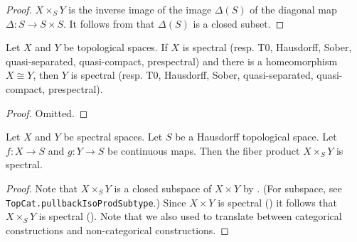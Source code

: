 \begin{proof}
  \leanok
  \(X \times_S Y\) is the inverse image of the image \(\Delta(S)\) of the diagonal map 
  \(\Delta : S \to S \times S\). It follows from  that 
  \(\Delta(S)\) is a closed subset.
\end{proof}

\begin{lemma}
  \label{thm:homeo-preserves-spectral}
  \leanok
  Let \(X\) and \(Y\) be topological spaces. If \(X\) is spectral (resp. T0, Hausdorff, Sober, quasi-separated, quasi-compact, prespectral) and there is a homeomorphism \(X \cong Y\), then \(Y\) is spectral (resp. T0, Hausdorff, Sober, quasi-separated, quasi-compact, prespectral).
\end{lemma}

\begin{proof}
  \leanok
  Omitted.
\end{proof}

\begin{lemma}
  \label{thm:pullback-spectral} 
  \leanok
  Let \(X\) and \(Y\) be spectral spaces. Let \(S\) be a Hausdorff topological space. Let \(f : X \to S\) and \(g : Y \to S\) be continuous maps. Then the fiber product \(X \times_S Y\) is spectral.
\end{lemma}

\begin{proof}
  \leanok
  Note that \(X \times_S Y\) is a closed subspace of $X \times Y$ by 
  . (For subspace, see 
  \verb`TopCat.pullbackIsoProdSubtype`.) Since $X \times Y$ is spectral 
  () it follows that \(X \times_S Y\) is spectral 
  (). Note that we also used 
  to translate between categorical constructions and non-categorical constructions.
\end{proof}

